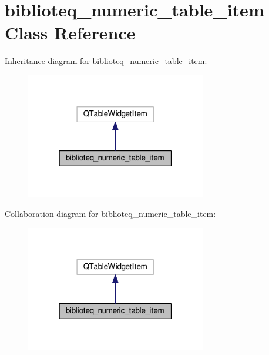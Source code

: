 \hypertarget{classbiblioteq__numeric__table__item}{}\section{biblioteq\+\_\+numeric\+\_\+table\+\_\+item Class Reference}
\label{classbiblioteq__numeric__table__item}


Inheritance diagram for biblioteq\+\_\+numeric\+\_\+table\+\_\+item\+:
\nopagebreak
\begin{figure}[H]
\begin{center}
\leavevmode
\includegraphics[width=223pt]{classbiblioteq__numeric__table__item__inherit__graph}
\end{center}
\end{figure}


Collaboration diagram for biblioteq\+\_\+numeric\+\_\+table\+\_\+item\+:
\nopagebreak
\begin{figure}[H]
\begin{center}
\leavevmode
\includegraphics[width=223pt]{classbiblioteq__numeric__table__item__coll__graph}
\end{center}
\end{figure}
